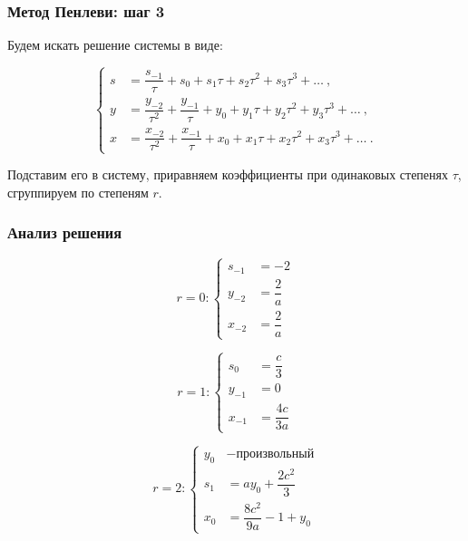 \documentclass[hyperref={pdftex,unicode}]{beamer}
\begin{document}
\begin{frame}

\frametitle{Метод Пенлеви: шаг 3}

Будем искать решение системы в виде:

$$
        \left\{
                \begin{aligned}
                        s &= \dfrac{s_{-1}}{\tau} + s_0 + s_1\tau + s_2\tau^2 + s_3\tau^3 + \ldots ~,  \\
                        y &= \dfrac{y_{-2}}{\tau^2} + \dfrac{y_{-1}}{\tau} + y_0 + y_1\tau + y_2\tau^2 + y_3\tau^3 + \ldots ~, \\
                        x &= \dfrac{x_{-2}}{\tau^2} + \dfrac{x_{-1}}{\tau} + x_0 + x_1\tau + x_2\tau^2 + x_3\tau^3 + \ldots ~.
                \end{aligned}
        \right.
$$

\vspace{20pt}

Подставим его в систему, приравняем коэффициенты при одинаковых степенях $ \tau $, сгруппируем по степеням $ r $.


\end{frame}



\begin{frame}

\frametitle{Анализ решения}
\begin{minipage}[H]{0.4\linewidth}

$$
r = 0:
\left\{
	\begin{aligned}
		s_{-1} &= -2 \\
		y_{-2} &= \dfrac{2}{a} \\
		x_{-2} &= \dfrac{2}{a}
	\end{aligned}
\right.
$$

\end{minipage}
\hfill
\begin{minipage}[H]{0.4\linewidth}

$$
r = 1:
\left\{
	\begin{aligned}
		s_{0} &= \dfrac{c}{3} \\
		y_{-1} &= 0 \\
		x_{-1} &= \dfrac{4c}{3a}
	\end{aligned}
\right.
$$

\end{minipage}

\vspace{20pt}

$$
r = 2:
\left\{
	\begin{aligned}
		y_{0} &- \text{произвольный} \\
		s_{1} &= ay_0 + \dfrac{2c^2}{3} \\
		x_{0} &= \dfrac{8c^2}{9a} - 1 + y_0
	\end{aligned}
\right.
$$

\end{frame}
\end{document}
